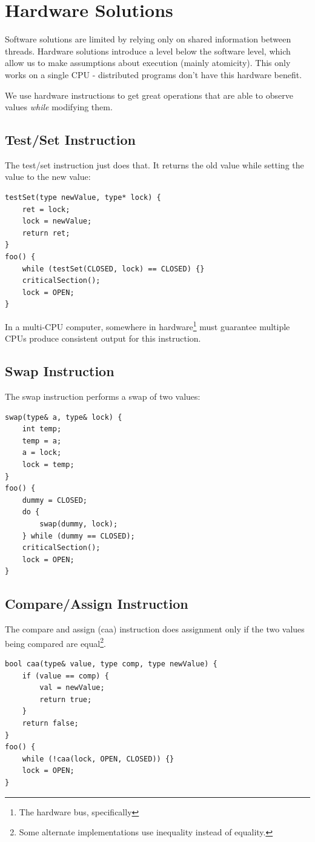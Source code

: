         \section{Hardware Solutions} %
        \label{sec:hardware_solutions}
            Software solutions are limited by relying only on shared information between threads.
            Hardware solutions introduce a level below the software level, which allow us to make assumptions about execution (mainly atomicity).
            This only works on a single CPU - distributed programs don't have this hardware benefit.

            We use hardware instructions to get great operations that are able to observe values \textit{while} modifying them.
            \subsection{Test/Set Instruction} %
            \label{sub:test_set_instruction}
                The test/set instruction just does that.
                It returns the old value while setting the value to the new value:
                \begin{lstlisting}
testSet(type newValue, type* lock) {
    ret = lock;
    lock = newValue;
    return ret;
}
foo() {
    while (testSet(CLOSED, lock) == CLOSED) {}
    criticalSection();
    lock = OPEN;
}
                \end{lstlisting}
                In a multi-CPU computer, somewhere in hardware\footnote{The hardware bus, specifically} must guarantee multiple CPUs produce consistent output for this instruction.
            \subsection{Swap Instruction} %
            \label{sub:swap_instruction}
                The swap instruction performs a swap of two values:
                \begin{lstlisting}
swap(type& a, type& lock) {
    int temp;
    temp = a;
    a = lock;
    lock = temp;
}
foo() {
    dummy = CLOSED;
    do {
        swap(dummy, lock);
    } while (dummy == CLOSED);
    criticalSection();
    lock = OPEN;
}
                \end{lstlisting}
            \subsection{Compare/Assign Instruction} %
            \label{sub:compare_assign_instruction}
                The compare and assign (caa) instruction does assignment only if the two values being compared are equal\footnote{Some alternate implementations use inequality instead of equality.}.
                \begin{lstlisting}
bool caa(type& value, type comp, type newValue) {
    if (value == comp) {
        val = newValue;
        return true;
    }
    return false;
}
foo() {
    while (!caa(lock, OPEN, CLOSED)) {}
    lock = OPEN;
}
                \end{lstlisting}
